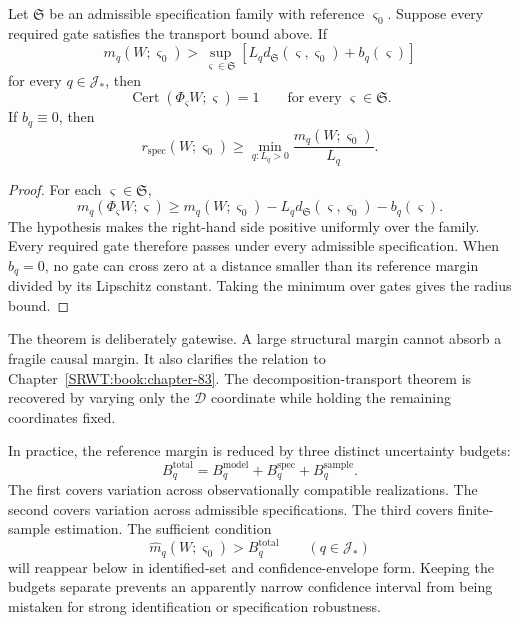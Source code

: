 
\begin{SRWTtheorem}
\label{SRWT:thm:specification-transport}
Let \(\mathfrak S\) be an admissible specification family with reference
\(\varsigma_0\). Suppose every required gate satisfies the transport bound
above. If
\[
\boxed{
 m_q(W;\varsigma_0)
>
\sup_{\varsigma\in\mathfrak S}
\left[
L_qd_{\mathfrak S}(\varsigma,\varsigma_0)
+b_q(\varsigma)
\right]
}
\]
for every \(q\in\mathcal J_*\), then
\[
\operatorname{Cert}(\Phi_{\varsigma}W;\varsigma)=1
\qquad
\text{for every }\varsigma\in\mathfrak S.
\]
If \(b_q\equiv0\), then
\[
\boxed{
r_{\mathrm{spec}}(W;\varsigma_0)
\geq
\min_{q:L_q>0}
\frac{m_q(W;\varsigma_0)}{L_q}.
}
\]
\end{SRWTtheorem}

\begin{proof}
For each \(\varsigma\in\mathfrak S\),
\[
m_q(\Phi_{\varsigma}W;\varsigma)
\geq
m_q(W;\varsigma_0)
-L_qd_{\mathfrak S}(\varsigma,\varsigma_0)
-b_q(\varsigma).
\]
The hypothesis makes the right-hand side positive uniformly over the family.
Every required gate therefore passes under every admissible specification.
When \(b_q=0\), no gate can cross zero at a distance smaller than its reference
margin divided by its Lipschitz constant. Taking the minimum over gates gives
the radius bound.
\end{proof}

The theorem is deliberately gatewise. A large structural margin cannot absorb
a fragile causal margin. It also clarifies the relation to Chapter~\ref{SRWT:book:chapter-83}. The
decomposition-transport theorem is recovered by varying only the
\(\mathcal D\) coordinate while holding the remaining coordinates fixed.


In practice, the reference margin is reduced by three distinct uncertainty
budgets:
\[
\boxed{
B_q^{\mathrm{total}}
=
B_q^{\mathrm{model}}
+B_q^{\mathrm{spec}}
+B_q^{\mathrm{sample}}.
}
\]
The first covers variation across observationally compatible realizations. The
second covers variation across admissible specifications. The third covers
finite-sample estimation. The sufficient condition
\[
\widehat m_q(W;\varsigma_0)
>
B_q^{\mathrm{total}}
\qquad(q\in\mathcal J_*)
\]
will reappear below in identified-set and confidence-envelope form. Keeping the
budgets separate prevents an apparently narrow confidence interval from being
mistaken for strong identification or specification robustness.


